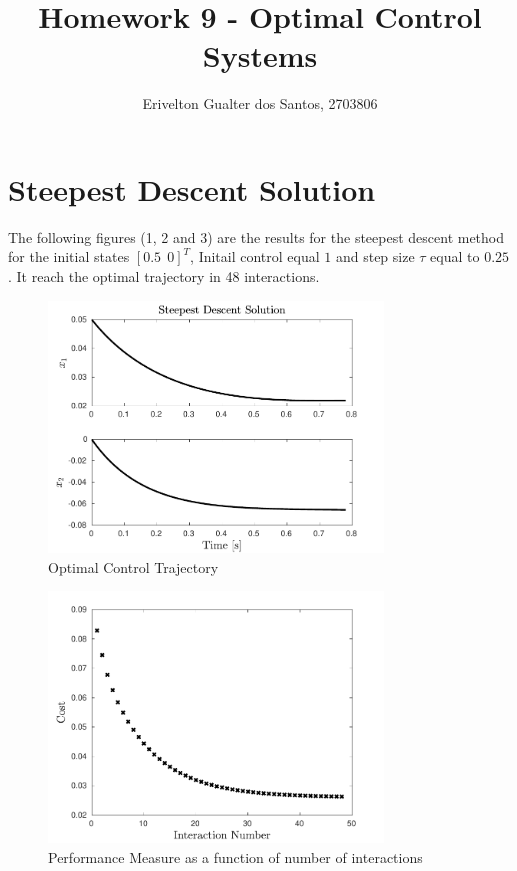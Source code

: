 \documentclass{article}
\begin{document}
\title{Homework 9 - Optimal Control Systems}
\author{Erivelton Gualter dos Santos, 2703806}
\date{}

\maketitle 

\section{Steepest Descent Solution}

The following figures (1, 2 and 3) are the results for the steepest descent method for the initial states $[0.5 \:\: 0]^T$, Initail control equal $1$ and step size $\tau$ equal to $0.25$. It reach the optimal trajectory in 48 interactions. 

\begin{figure}[H]
\centering
\includegraphics [width=3.5in]{fig1}
\caption{Optimal Control Trajectory}
\end{figure}

\begin{figure}[H]
\centering
\includegraphics [width=3.5in]{fig2}
\caption{Performance Measure as a function of number of interactions}
\end{figure}
\end{document}
